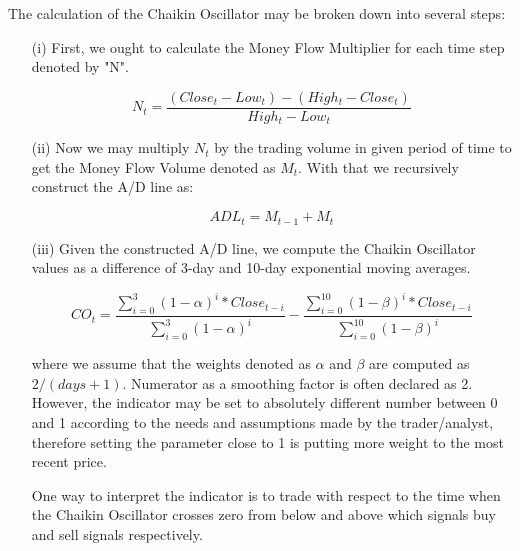 The calculation of the Chaikin Oscillator may be broken down into several steps:
\begin{itemize}
\item[(i)] First, we ought to calculate the Money Flow Multiplier for each time step denoted by "N".

\begin{equation}
N_{t} = \frac{(Close_{t} - Low_{t}) - (High_{t} - Close_{t})}{High_{t} - Low_{t}}
\end{equation}

\item[(ii)] Now we may multiply $N_t$ by the trading volume in given period of time to get the Money Flow Volume denoted as $M_t$. With that we recursively construct the A/D line as:

\begin{equation}
ADL_t = M_{t-1} + M_t
\end{equation}

\item[(iii)] Given the constructed A/D line, we compute the Chaikin Oscillator values as a difference of 3-day and 10-day exponential moving averages.

\begin{equation}
CO_t = \frac{\sum_{i=0}^{3} {(1-\alpha)}^i*Close_{t-i}}{\sum_{i=0}^{3} {(1-\alpha)}^i} - \frac{\sum_{i=0}^{10} {(1-\beta)}^i*Close_{t-i}}{\sum_{i=0}^{10} {(1-\beta)}^i}
\end{equation}

where we assume that the weights denoted as $\alpha$ and $\beta$ are computed as $2/(days + 1)$. Numerator as a smoothing factor is often declared as 2. However, the indicator may be set to absolutely different number between 0 and 1 according to the needs and assumptions made by the trader/analyst, therefore setting the parameter close to 1 is putting more weight to the most recent price.

One way to interpret the indicator is to trade with respect to the time when the Chaikin Oscillator crosses zero from below and above which signals buy and sell signals respectively.

\end{itemize}


